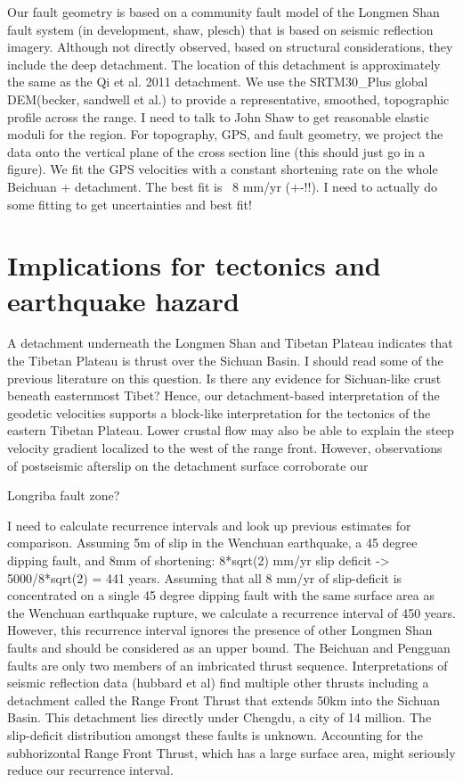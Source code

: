 \documentclass[12pt]{article}
\begin{document}
Our fault geometry is based on a community fault model of the Longmen Shan fault system (in development, shaw, plesch) that is based on seismic reflection imagery.
Although not directly observed, based on structural considerations, they include the deep detachment.
The location of this detachment is approximately the same as the Qi et al. 2011 detachment. We use the SRTM30\_Plus global DEM(becker, sandwell et al.)  to provide a representative, smoothed, topographic profile across the range. 
I need to talk to John Shaw to get reasonable elastic moduli for the region.
For topography, GPS, and fault geometry, we project the data onto the vertical plane of the cross section line (this should just go in a figure).
We fit the GPS velocities with a constant shortening rate on the whole Beichuan + detachment. The best fit is ~8 mm/yr (+-!!). 
I need to actually do some fitting to get uncertainties and best fit!

\section{Implications for tectonics and earthquake hazard}
A detachment underneath the Longmen Shan and Tibetan Plateau indicates that the Tibetan Plateau is thrust over the Sichuan Basin. I should read some of the previous literature on this question. Is there any evidence for Sichuan-like crust beneath easternmost Tibet? 
Hence, our detachment-based interpretation of the geodetic velocities supports a block-like interpretation for the tectonics of the eastern Tibetan Plateau. Lower crustal flow may also be able to explain the steep velocity gradient localized to the west of the range front. However, observations of postseismic afterslip on the detachment surface corroborate our  

Longriba fault zone?

I need to calculate recurrence intervals and look up previous estimates for comparison. 
Assuming 5m of slip in the Wenchuan earthquake, a 45 degree dipping fault, and 8mm of shortening: 8*sqrt(2) mm/yr slip deficit -> 5000/8*sqrt(2) = 441 years.
Assuming that all 8 mm/yr of slip-deficit is concentrated on a single 45 degree dipping fault with the same surface area as the Wenchuan earthquake rupture, we calculate a recurrence interval of 450 years.
However, this recurrence interval ignores the presence of other Longmen Shan faults and should be considered as an upper bound. The Beichuan and Pengguan faults are only two members of an imbricated thrust sequence. Interpretations of seismic reflection data (hubbard et al) find multiple other thrusts including a detachment called the Range Front Thrust that extends 50km into the Sichuan Basin. This detachment lies directly under Chengdu, a city of 14 million. The slip-deficit distribution amongst these faults is unknown. Accounting for the subhorizontal Range Front Thrust, which has a large surface area, might seriously reduce our recurrence interval.
\end{document}
